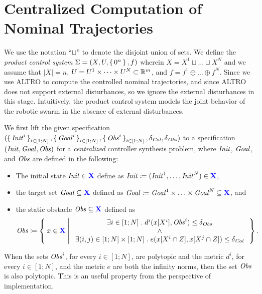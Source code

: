 
\section{Centralized Computation of Nominal Trajectories}\label{sec:nominal trajectory}
We use the notation ``$\sqcup$'' to denote the disjoint union of sets.
We define the \emph{product control system} $\Sigma = (X, U, \set{0^n}, f)$ wherein $X=X^1\sqcup \ldots \sqcup X^N$ and we assume that $|X|=n$, $U=U^1\times\dots\times U^N\subset \mathbb{R}^m$, and $f=f^{1}\oplus \ldots\oplus f^{N}$. 
Since we use ALTRO to compute the controlled nominal trajectories, and since ALTRO does not support external disturbances, so we ignore the external disturbances in this stage.
Intuitively, the product control system models the joint behavior of the robotic swarm in the absence of external disturbances.

We first lift the given specification $(\set{\mathit{Init}^i}_{i\in [1;N]}, \set{\mathit{Goal}^i}_{i\in [1;N]}, \set{\mathit{Obs}^i}_{i\in [1;N]}, \delta_{\mathit{Col}}, \delta_{\mathit{Obs}})$ to a specification $(\mathit{Init}, \mathit{Goal}, \mathit{Obs})$ for a \emph{centralized} controller synthesis problem, where $\mathit{Init}$, $\mathit{Goal}$, and $\mathit{Obs}$ are defined in the following:
\begin{itemize}
	\item The initial state $\mathit{Init}\in {\color{blue} \mathbf{X}}$ define as $\mathit{Init} \coloneqq (\mathit{Init}^1, \ldots, \mathit{Init}^N) \in {\color{blue} \mathbf{X}}$,
	\item the target set $\mathit{Goal}\subseteq {\color{blue} \mathbf{X}}$ defined as $\mathit{Goal} \coloneqq \mathit{Goal}^1\times \ldots \times \mathit{Goal}^N \subseteq {\color{blue} \mathbf{X}}$, and
	\item the static obstacle $\mathit{Obs}\subseteq {\color{blue} \mathbf{X}}$ defined as 
		\begin{equation}
			\mathit{Obs} \coloneqq 
				\Set{ x\in {\color{blue} \mathbf{X}} | 
					\begin{array}{c}
						\exists i\in [1;N]\;.\; d^i(x[X^i], \mathit{Obs}^i)\leq \delta_{\mathit{Obs}}\\
						\wedge\\
						 \exists (i,j)\in [1;N]\times [1;N]\;.\; e(x[X^i\cap Z],x[X^j\cap Z])\leq \delta_{\mathit{Col}}
					\end{array}}.
		\end{equation}
\end{itemize}
When the sets $\mathit{Obs}^i$, for every $i\in [1;N]$, are polytopic and the metric $d^i$, for every $i\in [1;N]$, and the metric $e$ are both the infinity norms, then the set $\mathit{Obs}$ is also polytopic.
This is an useful property from the perspective of implementation.

